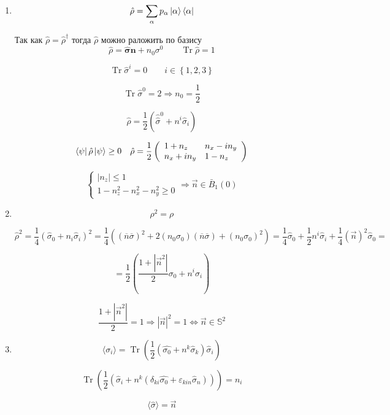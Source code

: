 \begin{solution}
	\begin{enumerate}
		\item
		$$
		\hat{\rho}=\sum_{\alpha} p_{\alpha}\ket{\alpha}\bra{\alpha}
		$$
		
		Так как $ \hat{\rho} = \hat{\rho}^\dagger $  тогда $ \hat{\rho} $ можно раложить по базису 
		$$
		\hat{\rho} = \hat{\boldsymbol{\sigma}}\boldsymbol{n} + n_0 \sigma^0
		\qquad
		\operatorname{Tr} \hat{\rho}=1
		$$
		
		$$
		\operatorname{Tr} \hat{\sigma}^{i}=0 \qquad i \in \left\lbrace 1,2,3\right\rbrace
		$$
		
		$$
		\operatorname{Tr} \hat{\sigma}^{0}=2 \Longrightarrow n_{0}=\frac{1}{2}
		$$
		
		$$
		\hat{\rho}=\frac{1}{2}\left(\hat{\hat{\sigma}}^{0}+n^{i} \hat{\sigma}_{i}\right)
		$$
		
		$$
		\bra{\psi}\hat{\rho}\ket{\psi}\geq 0
		\quad
		\hat{\rho} = 
		\frac{1}{2}\left(\begin{array}{ll}{1+n_{z}} & {n_{x} -i n_{y}} \\ n_{x}+{i n_{y}} & {1-n_{z}}\end{array}\right)
		$$
		
		
		$$
		\left\lbrace\begin{array}{l}{\left|n_{z}\right| \leq 1} \\ {1-n_{z}^{2}-n_{x}^{2}-n_y^{2} \geq 0}\end{array}\right.
		\Longrightarrow
		\vec{n} \in \bar{B}_{1}(0)
		$$
		
		\item 
		
		$$
		\rho^{2}=\rho
		$$
		
		$$
		\hat{\rho}^{2}=\frac{1}{4}\left(\hat{\sigma}_{0}+n_i \hat{\sigma}_{i}\right)^{2} =\frac{1}{4} \left(
		\left(\overline{n} \overline{\sigma}\right)^{2}+2\left(n_{0} \sigma_0\right)(\overline{n} \overline{\sigma})+\left(n_{0} \sigma_0 \right)^{2}
		\right) = 
		\frac{1}{4} \hat{\sigma}_{0}+\frac{1}{2} n^{i} \hat{\sigma}_{i}+\frac{1}{4}(\vec{n})^{2} \hat{\sigma}_{0} =
		$$
		
		$$
		=\frac{1}{2}\left(\frac{1+|\vec{n}^2|}{2}\sigma_{0} +n^i \sigma_{i}\right)
		$$
		
		$$	
		\frac{1+|\vec{n}^2|}{2}=1 \Longrightarrow 	|\vec{n}|^{2}=1 \Longleftrightarrow 
		\vec{n} \in \mathbb{S}^{2}
		$$
		
		\item 
		$$
		\langle \sigma_{i}\rangle = \operatorname{Tr}\left( \frac{1}{2}\left( \hat{\sigma_{0}}+ n^k \hat{\sigma}_k\right) \hat{\sigma}_{i} \right)
		$$
		
		
		$$
		\operatorname{Tr}\left(\frac{1}{2}\left(\hat{\sigma}_{i}+n^{k}\left(\delta_{ki} \hat{\sigma_{0}}+\varepsilon_{kin} \hat{\sigma}_{n}\right)\right)\right) = 
		n_{i}
		$$
		
		$$
		\langle\hat{\sigma}\rangle=\vec{n}
		$$
		
	\end{enumerate}
\end{solution}	
	